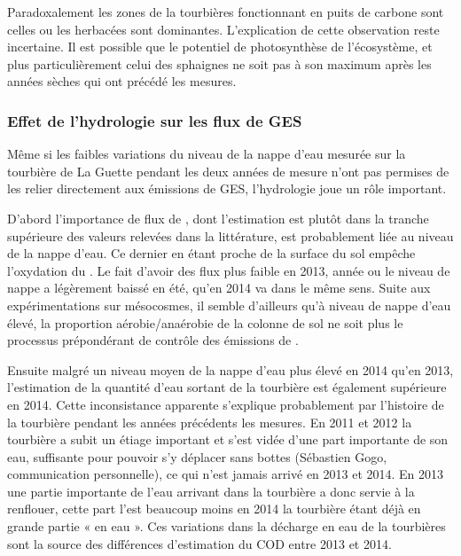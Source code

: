 Paradoxalement les zones de la tourbières fonctionnant en puits de carbone sont celles ou les herbacées sont dominantes.
L'explication de cette observation reste incertaine.
Il est possible que le potentiel de photosynthèse de l'écosystème, et plus particulièrement celui des sphaignes ne soit pas à son maximum après les années sèches qui ont précédé les mesures.

\subsubsection{Effet de l'hydrologie sur les flux de GES}

Même si les faibles variations du niveau de la nappe d'eau mesurée sur la tourbière de La Guette pendant les deux années de mesure n'ont pas permises de les relier directement aux émissions de GES, l'hydrologie joue un rôle important.

D'abord l'importance de flux de \chh, dont l'estimation est plutôt dans la tranche supérieure des valeurs relevées dans la littérature, est probablement liée au niveau de la nappe d'eau.
Ce dernier en étant proche de la surface du sol empêche l'oxydation du \chh.
Le fait d'avoir des flux plus faible en 2013, année ou le niveau de nappe a légèrement baissé en été, qu'en 2014 va dans le même sens.
Suite aux expérimentations sur mésocosmes, il semble d'ailleurs qu'à niveau de nappe d'eau élevé, la proportion aérobie/anaérobie de la colonne de sol ne soit plus le processus prépondérant de contrôle des émissions de \chh.


Ensuite malgré un niveau moyen de la nappe d'eau plus élevé en 2014 qu'en 2013, l'estimation de la quantité d'eau sortant de la tourbière est également supérieure en 2014.
Cette inconsistance apparente s'explique probablement par l'histoire de la tourbière pendant les années précédents les mesures.
En 2011 et 2012 la tourbière a subit un étiage important et s'est vidée d'une part importante de son eau, suffisante pour pouvoir s'y déplacer sans bottes (Sébastien Gogo, communication personnelle), ce qui n'est jamais arrivé en 2013 et 2014.
En 2013 une partie importante de l'eau arrivant dans la tourbière a donc servie à la renflouer, cette part l'est beaucoup moins en 2014 la tourbière étant déjà en grande partie « en eau ».
Ces variations dans la décharge en eau de la tourbières sont la source des différences d'estimation du COD entre 2013 et 2014.

